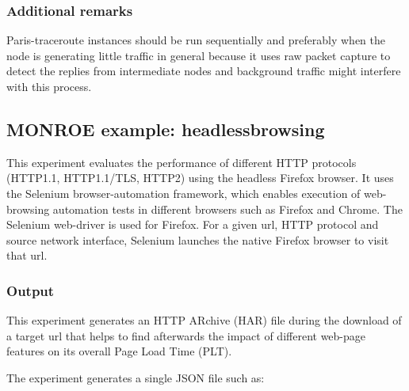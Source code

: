 \documentclass[a4paper,10pt]{article}
\newcommand{\monroe}{MONROE}
\begin{document}
\subsubsection{Additional remarks}

Paris-traceroute instances should be run sequentially and preferably when the node is generating little traffic in general because it uses raw packet capture to detect the replies from intermediate nodes and background traffic might interfere with this process.


\subsection{\monroe{} example: headlessbrowsing}

This experiment evaluates the performance of different HTTP protocols (HTTP1.1, HTTP1.1/TLS, HTTP2) using the headless Firefox browser.
It uses the Selenium browser-automation framework, which enables execution of web-browsing automation tests in different browsers such as Firefox and Chrome.
The Selenium web-driver is used for Firefox.
For a given url, HTTP protocol and source network interface, Selenium launches the native Firefox browser to visit that url.

\subsubsection{Output}
This experiment generates an HTTP ARchive (HAR) file during the download of a target url that helps to find afterwards the impact of different web-page features on its overall Page Load Time (PLT).

The experiment generates a single JSON file such as:
\end{document}
